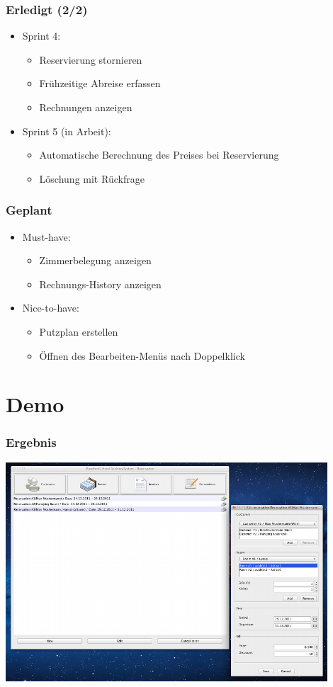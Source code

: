 \documentclass{beamer}
\begin{document}
\begin{frame}
\frametitle{Erledigt (2/2)} 
\begin{itemize}
\item  Sprint 4:
\begin{itemize}
\item  Reservierung stornieren
\item  Fr\"uhzeitige Abreise erfassen
\item  Rechnungen anzeigen
\end{itemize}
\item  Sprint 5 (in Arbeit):
\begin{itemize}
\item  Automatische Berechnung des Preises bei Reservierung
\item  L\"oschung mit R\"uckfrage
\end{itemize}
\end{itemize}
\end{frame}

\begin{frame}
\frametitle{Geplant} 
\begin{itemize}
\item  Must-have:
\begin{itemize}
\item  Zimmerbelegung anzeigen
\item  Rechnungs-History anzeigen
\end{itemize}
\item  Nice-to-have:
\begin{itemize}
\item  Putzplan erstellen
\item  \"Offnen des Bearbeiten-Men\"us nach Doppelklick
\end{itemize}
\end{itemize}
\end{frame}

\section{Demo} 

\begin{frame}
\frametitle{Ergebnis} 
\begin{overprint}
\begin{center}
\includegraphics [width=0.9\textwidth] {img/demo.png}
\end{center}
\end{overprint}
\end{frame}
\end{document}
